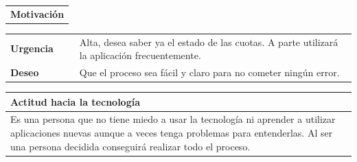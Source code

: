 \documentclass[11pt]{article}
\begin{document}
\begin{table}[H]
	\begin{tabular}{l}
		\textbf{Motivación} 
	\end{tabular}
	
	\begin{tabular}{p{0.2\linewidth}|p{0.8\linewidth}}
		\toprule
		\textbf{Urgencia} & Alta, desea saber ya el estado de las cuotas. A parte utilizará la aplicación frecuentemente.\\
		\textbf{Deseo}  & Que el proceso sea fácil y claro para no cometer ningún error.
		 \\
		\bottomrule
	\end{tabular}
	
	\begin{tabular}{p{1.028\linewidth}}
		\textbf{Actitud hacia la tecnología}\\
		\midrule
		Es una persona que no tiene miedo a usar la tecnología ni aprender a utilizar aplicaciones nuevas aunque a veces tenga problemas para entenderlas. Al ser una persona decidida conseguirá realizar todo el proceso.
		
	\end{tabular}
\end{table}
\end{document}
